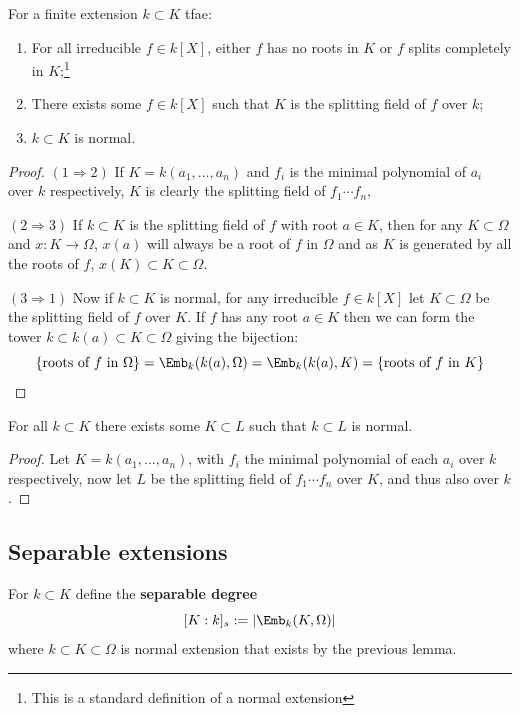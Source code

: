 \documentclass{article}
\begin{document}
\begin{theorem}
    For a finite extension $k\subset K$ tfae: \begin{enumerate}
        \item For all irreducible $f\in k[X]$, either $f$ has no roots in $K$ or $f$ splits completely in $K$;\footnote{This is a standard definition of a normal extension}
        \item There exists some $f\in k[X]$ such that $K$ is the splitting field of $f$ over $k$;
        \item $k\subset K$ is normal.
    \end{enumerate}
    \begin{proof}
        $(1\Rightarrow2)$ If $K=k(a_1,\ldots,a_n)$ and $f_i$ is the minimal polynomial of $a_i$ over $k$ respectively, $K$ is clearly the splitting field of $f_1\cdots f_n$,

        $(2\Rightarrow3)$ If $k\subset K$ is the splitting field of $f$ with root $a\in K$, then for any $K\subset \Omega$ and $x:K\rightarrow \Omega$, $x(a)$ will always be a root of $f$ in $\Omega$ and as $K$ is generated by all the roots of $f$, $x(K)\subset K \subset \Omega$.

        $(3\Rightarrow 1)$ Now if $k\subset K$ is normal, for any irreducible $f\in k[X]$ let $K\subset\Omega$ be the splitting field of $f$ over $K$. If $f$ has any root $a\in K$ then we can form the tower $k\subset k(a)\subset K\subset \Omega$ giving the bijection: \[
            \{\text{roots of $f$ in $\Omega$}\} = \Emb_k(k(a),\Omega) = \Emb_k(k(a),K) = \{\text{roots of $f$ in $K$}\}\qedhere
        \] 
    \end{proof}
\end{theorem}

\begin{lemma}
    For all $k\subset K$ there exists some $K\subset L$ such that $k\subset L$ is normal.\begin{proof}
        Let $K=k(a_1,\ldots,a_n)$, with $f_i$ the minimal polynomial of each $a_i$ over $k$ respectively, now let $L$ be the splitting field of $f_1\cdots f_n$ over $K$, and thus also over $k$.
    \end{proof}
\end{lemma}

\subsection{Separable extensions}

\begin{definition}
    For $k\subset K$ define the \textbf{separable degree}\[
        [K:k]_s := \abs{\Emb_k(K,\Omega)}
    \] where $k\subset K \subset \Omega$ is normal extension that exists by the previous lemma.
\end{definition}
\end{document}
